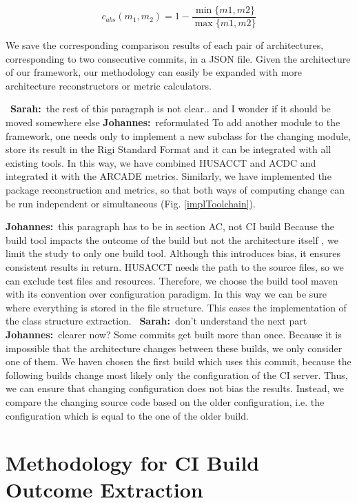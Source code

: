 \documentclass[sigplan, anonymous, review]{acmart}
\newcommand{\sn}[1]{{\color{blue}\textbf{Sarah:}~#1}}
\newcommand{\jk}[1]{{\color{violet}\textbf{Johannes:}~#1}}
\begin{document}
\begin{equation} \label{eq:absDiff}
	c_{abs}(m_1, m_2) = 1 - \frac{\min\{m1, m2\}}{\max\{m1, m2\}}
\end{equation} 


We save the corresponding comparison results of each pair of architectures, corresponding to two consecutive commits, in a JSON file. Given the architecture of our framework, our methodology can easily be expanded with more architecture reconstructors or metric calculators. 

~\sn{the rest of this paragraph is not clear.. and I wonder if it should be moved somewhere else} \jk{reformulated}
To add another module to the framework, one needs only to implement a new subclass for the changing module, store its result in the Rigi Standard Format and it can be integrated with all existing tools. 
In this way, we have combined HUSACCT and ACDC and integrated it with the ARCADE metrics. Similarly, we have implemented the package reconstruction and metrics, so that both ways of computing change can be run independent or simultaneous (Fig. \ref{implToolchain}).

\jk{this paragraph has to be in section AC, not CI build}
Because the build tool impacts the outcome of the build but not the architecture itself \cite{FailsCorr}, we limit the study to only one build tool. Although this introduces bias, it ensures consistent results in return. HUSACCT needs the path to the source files, so we can exclude test files and resources. Therefore, we choose the build tool maven with its convention over configuration paradigm. In this way we can be sure where everything is stored in the file structure. This eases the implementation of the class structure extraction. ~\sn{don't understand the next part} \jk{clearer now?}
Some commits get built more than once. Because it is impossible that the architecture changes between these builds, we only consider one of them. 
We haven chosen the first build which uses this commit, because the following builds change most likely only the configuration of the CI server. 
Thus, we can ensure that changing configuration does not bias the results. Instead, we compare the changing source code based on the older configuration, i.e. the configuration which is equal to the one of the older build. 

\section{Methodology for CI Build Outcome Extraction}
\label{sec:ci-build-outcome}
\end{document}
